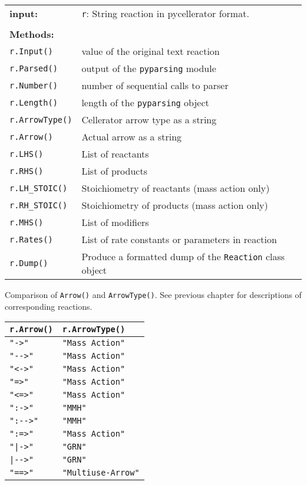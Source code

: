 \begin{tabular}{ll}
\textbf{input:} & {\tt r}: String reaction in pycellerator format. \\ \\
\multicolumn{2}{l}{\textbf{Methods:}}\\
{\tt r.Input()} & value of the original text reaction\\
{\tt r.Parsed()} & output of the {\tt pyparsing} module\\
{\tt r.Number()} & number of sequential calls to parser\\
{\tt r.Length()} & length of the {\tt pyparsing} object\\
{\tt r.ArrowType()} & Cellerator arrow type as a string\\
{\tt r.Arrow()} & Actual arrow as a string\\
{\tt r.LHS()} & List of reactants\\
{\tt r.RHS()} & List of products\\
{\tt r.LH\_STOIC()} & Stoichiometry of reactants (mass action only)\\
{\tt r.RH\_STOIC()} & Stoichiometry of products (mass action only)\\
{\tt r.MHS()} & List of modifiers\\
{\tt r.Rates()} & List of rate constants or parameters in reaction\\
{\tt r.Dump()} & Produce a formatted dump of the {\tt Reaction} class object
\end{tabular}
\begin{center}
\begin{minipage}{4in}
Comparison of {\tt Arrow()} and {\tt ArrowType()}. See previous chapter for descriptions of corresponding reactions.\\
\begin{center}
\begin{tabular}{|ll|}
\hline
{\tt r.Arrow()} & {\tt r.ArrowType()} \\
\hline
\verb!"->"!  & \verb!"Mass Action"! \\
\verb!"-->"! & \verb!"Mass Action"! \\
\verb!"<->"! & \verb!"Mass Action"! \\
\verb!"=>"!  & \verb!"Mass Action"! \\
\verb!"<=>"! & \verb!"Mass Action"! \\
\verb!":->"! & \verb!"MMH"! \\
\verb!":-->"! &\verb!"MMH"! \\
\verb!":=>"! & \verb!"Mass Action"! \\
\verb!"|->"! & \verb!"GRN"! \\
\verb!|-->"! & \verb!"GRN"! \\
\verb!"==>"! & \verb!"Multiuse-Arrow"! \\
\hline
\end{tabular}
\end{center}
\end{minipage}
\end{center}

